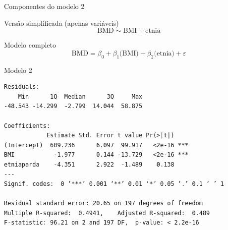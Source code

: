 \documentclass{beamer}
\begin{document}
\begin{frame}{\small Componentes do modelo 2}
  \begin{block}{\footnotesize Versão simplificada (apenas variáveis)}
    \footnotesize
    \begin{displaymath}
      \text{BMD} \sim \text{BMI} + \text{etnia}
    \end{displaymath}
  \end{block}
  \bigskip
  \bigskip
  \begin{block}{Modelo completo}
    \begin{displaymath}
      \text{BMD} =\beta_0 + \beta_1 \text{(BMI)} + \beta_2 \text{(etnia)} +\varepsilon
    \end{displaymath}
  \end{block}
  \vfill
\end{frame}

\begin{frame}[fragile]{}
  \begin{center}
    \begin{exampleblock}{Modelo 2}
      \tiny
\begin{verbatim}
Residuals:
    Min      1Q  Median      3Q     Max 
-48.543 -14.299  -2.799  14.044  58.875 

Coefficients:
            Estimate Std. Error t value Pr(>|t|)    
(Intercept)  609.236      6.097  99.917   <2e-16 ***
BMI           -1.977      0.144 -13.729   <2e-16 ***
etniaparda    -4.351      2.922  -1.489    0.138    
---
Signif. codes:  0 ‘***’ 0.001 ‘**’ 0.01 ‘*’ 0.05 ‘.’ 0.1 ‘ ’ 1

Residual standard error: 20.65 on 197 degrees of freedom
Multiple R-squared:  0.4941,	Adjusted R-squared:  0.489 
F-statistic: 96.21 on 2 and 197 DF,  p-value: < 2.2e-16
\end{verbatim}
    \end{exampleblock}
  \end{center}
\end{frame}
\end{document}
